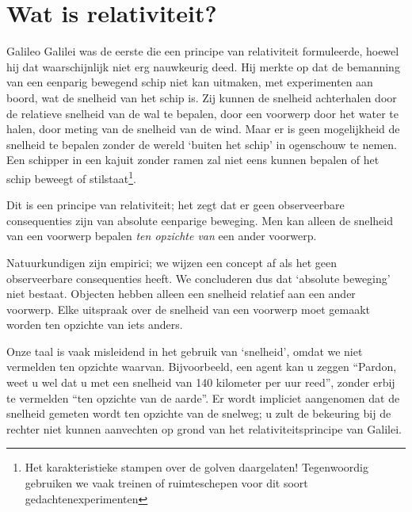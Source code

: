 \section{Wat is relativiteit?}
Galileo Galilei was de eerste die een principe van relativiteit
formuleerde, hoewel hij dat waarschijnlijk niet erg nauwkeurig
deed. Hij merkte op dat de bemanning van een eenparig bewegend schip
niet kan uitmaken, met experimenten aan boord, wat de snelheid van het
schip is. Zij kunnen de snelheid achterhalen door de relatieve
snelheid van de wal te bepalen, door een voorwerp door het water te
halen, door meting van de snelheid van de wind. Maar er is geen
mogelijkheid de snelheid te bepalen zonder de wereld `buiten het
schip' in ogenschouw te nemen. Een schipper in een kajuit zonder ramen
zal niet eens kunnen bepalen of het schip beweegt of
stilstaat\footnote{Het karakteristieke stampen over de golven
daargelaten! Tegenwoordig gebruiken we vaak treinen of ruimteschepen voor dit soort gedachtenexperimenten}.

Dit is een principe van relativiteit; het zegt dat er geen observeerbare
consequenties zijn van absolute eenparige beweging. Men kan alleen de
snelheid van een voorwerp bepalen {\it ten opzichte van} een ander
voorwerp.

Natuurkundigen zijn empirici; we wijzen een concept af als het geen
observeerbare consequenties heeft. We concluderen dus dat `absolute
beweging' niet bestaat. Objecten hebben alleen een snelheid relatief
aan een ander voorwerp. Elke uitspraak over de snelheid van een
voorwerp moet gemaakt worden ten opzichte van iets anders.

Onze taal is vaak misleidend in het gebruik van `snelheid', omdat we
niet vermelden ten opzichte waarvan. Bijvoorbeeld, een agent kan u
zeggen ``Pardon, weet u wel dat u met een snelheid van 140 kilometer
per uur reed'', zonder erbij te vermelden ``ten opzichte van de
aarde''. Er wordt impliciet aangenomen dat de snelheid gemeten wordt
ten opzichte van de snelweg; u zult de bekeuring bij de rechter niet
kunnen aanvechten op grond van het relativiteitsprincipe van Galilei.

